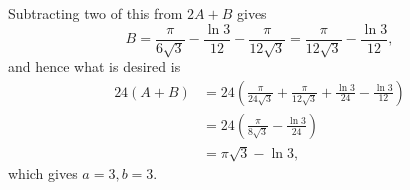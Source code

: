 \begin{enumerate}
          Subtracting two of this from \(2A + B\) gives
          \[
              B = \frac{\pi}{6 \sqrt{3}} - \frac{\ln 3}{12} - \frac{\pi}{12 \sqrt{3}} = \frac{\pi}{12\sqrt{3}} - \frac{\ln 3}{12},
          \]
          and hence what is desired is
          \begin{align*}
              24(A + B) & = 24 \left(\frac{\pi}{24 \sqrt{3}} + \frac{\pi}{12 \sqrt{3}} + \frac{\ln 3}{24} - \frac{\ln 3}{12}\right) \\
                        & = 24 \left(\frac{\pi}{8 \sqrt{3}} - \frac{\ln 3}{24}\right)                                               \\
                        & = \pi \sqrt{3} - \ln 3,
          \end{align*}
          which gives \(a = 3, b = 3\).
\end{enumerate}